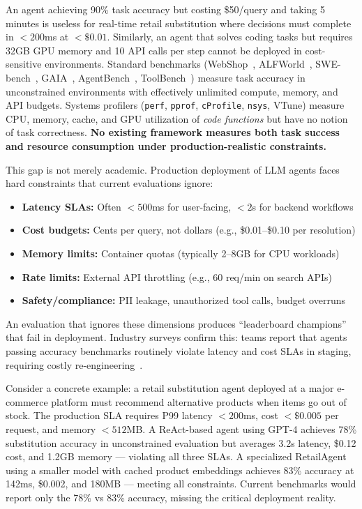 \documentclass[letterpaper, 10 pt, conference]{ieeeconf}
\begin{document}
An agent achieving 90\% task accuracy but costing \$50/query and taking 5 minutes is useless for real-time retail substitution where decisions must complete in $<200$ms at $<\$0.01$. Similarly, an agent that solves coding tasks but requires 32GB GPU memory and 10 API calls per step cannot be deployed in cost-sensitive environments. Standard benchmarks (WebShop~\cite{yao2022webshop}, ALFWorld~\cite{shridhar2020alfworld}, SWE-bench~\cite{jimenez2023swebench}, GAIA~\cite{mialon2023gaia}, AgentBench~\cite{liu2023agentbench}, ToolBench~\cite{xu2023toolbench}) measure task accuracy in unconstrained environments with effectively unlimited compute, memory, and API budgets. Systems profilers (\texttt{perf}, \texttt{pprof}, \texttt{cProfile}, \texttt{nsys}, VTune) measure CPU, memory, cache, and GPU utilization of \textit{code functions} but have no notion of task correctness. \textbf{No existing framework measures both task success and resource consumption under production-realistic constraints.}

This gap is not merely academic. Production deployment of LLM agents faces hard constraints that current evaluations ignore:
\begin{itemize}
    \item \textbf{Latency SLAs:} Often $<500$ms for user-facing, $<2$s for backend workflows
    \item \textbf{Cost budgets:} Cents per query, not dollars (e.g., \$0.01--\$0.10 per resolution)
    \item \textbf{Memory limits:} Container quotas (typically 2--8GB for CPU workloads)
    \item \textbf{Rate limits:} External API throttling (e.g., 60 req/min on search APIs)
    \item \textbf{Safety/compliance:} PII leakage, unauthorized tool calls, budget overruns
\end{itemize}
An evaluation that ignores these dimensions produces ``leaderboard champions'' that fail in deployment. Industry surveys confirm this: teams report that agents passing accuracy benchmarks routinely violate latency and cost SLAs in staging, requiring costly re-engineering~\cite{langsmith2024production}.

Consider a concrete example: a retail substitution agent deployed at a major e-commerce platform must recommend alternative products when items go out of stock. The production SLA requires P99 latency $<200$ms, cost $<\$0.005$ per request, and memory $<512$MB. A ReAct-based agent using GPT-4 achieves 78\% substitution accuracy in unconstrained evaluation but averages 3.2s latency, \$0.12 cost, and 1.2GB memory --- violating all three SLAs. A specialized RetailAgent using a smaller model with cached product embeddings achieves 83\% accuracy at 142ms, \$0.002, and 180MB --- meeting all constraints. Current benchmarks would report only the 78\% vs 83\% accuracy, missing the critical deployment reality.
\end{document}
